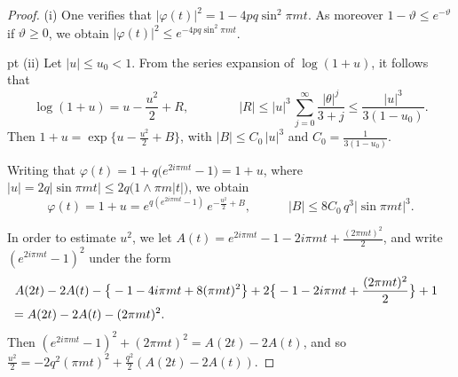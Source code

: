 \documentclass[11pt,draft,reqno]{amsart}
\theoremstyle{definition}
\theoremstyle{remarks}
\numberwithin{equation}{section}
\def \p{{\varphi}}
\def \t{{\vartheta}}
\def \qq{{\qquad}}
\begin{document}
   \begin{proof} (i) One verifies that $|\p(t)|^2=1- 4 pq \sin^2\pi mt.$ As moreover $1-\t\le e^{-\t}$ if  ${\vartheta} \ge 0$, we obtain $|\p(t)|^2\le e^{-4 pq \sin^2\pi mt}$. 

 pt  (ii) Let  $|u|\le u_0<1$. From the series expansion of $\log(1+u)$,  it follows that
$$\log(1+u)=u-\frac{u^2}{2}+R, \qq \qquad|R|\le |u|^3\,\sum_{j=0}^\infty \frac{|\theta|^j}{3+j}\le \frac{|u|^3}{3(1- u_0 )}.$$
 Then $ 1+u= \exp\{ u -\frac{u^2}{2} +B\}$,  with $|B|\le C_0\,|u|^3$ 
and  $C_0=\frac{1}{3(1- u_0 )}$.

 Writing that  $\p(t)= 1 +
q\big( e^{2i\pi mt} -1\big)=1 + u$,
  where $|u|= 2q|\sin\pi mt|\le  2q\big(1\wedge   \pi m|t| \big) $, we obtain 
  \begin{equation}\label{phi.u} \p(t)= 1+u=e^{q ( e^{2i\pi mt} -1 ) }\, e^{  -\frac{u^2}{2} +B}, \qq 
\quad |B|\le 8C_0\,q^3 |\sin\pi mt|^3.
\end{equation}
   
   In order to   estimate $u^2$, we let  $A(t)= e^{2i\pi mt} -1-  2i\pi mt+ \frac{(2 \pi mt)^2 }{2}$, and    write  $ (  e^{2i\pi mt} -1 )^2$ under the form 
\begin{align*} 
   &\   A(2t)-2A( t) -\big\{  -1-  4i\pi mt+ 8 ( \pi mt)^2\big\} +2\big\{ -1-  2i\pi mt+ \frac{(2 \pi mt)^2 }{2}\big\}+1
\cr &=
   A(2t)-2A( t) -     ( 2\pi mt)^2.
\end{align*}
Then
$ ( e^{2i\pi mt} -1 )^2+     ( 2\pi mt)^2 =    A(2t)-2A( t)$,
 and so   
  $\frac{u^2}{2}=-  2q^2(  \pi mt)^2+  \frac{q^2}{2}(A(2t)-2A( t)).$ 
 

\end{proof}
\end{document}
